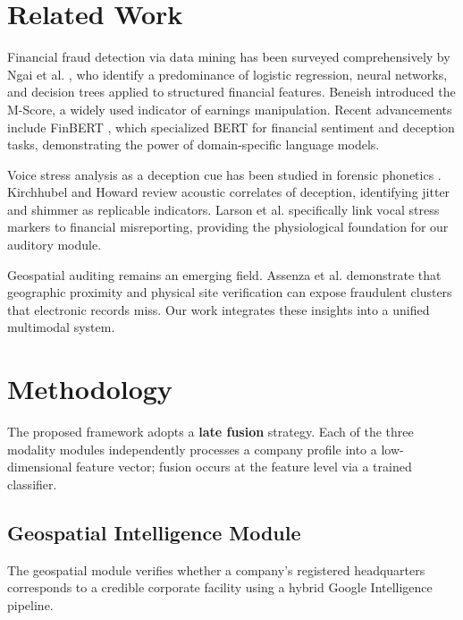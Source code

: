 \documentclass[conference]{IEEEtran}
\begin{document}
\section{Related Work}

Financial fraud detection via data mining has been surveyed comprehensively by
Ngai et al. \cite{ngai2011}, who identify a predominance of logistic regression,
neural networks, and decision trees applied to structured financial features.
Beneish \cite{beneish1999} introduced the M-Score, a widely used indicator of 
earnings manipulation. Recent advancements include FinBERT \cite{yang2020}, 
which specialized BERT for financial sentiment and deception tasks, demonstrating 
the power of domain-specific language models.

Voice stress analysis as a deception cue has been studied in forensic phonetics 
\cite{hollien1990}. Kirchhubel and Howard \cite{kirchhubel2013} review acoustic 
correlates of deception, identifying jitter and shimmer as replicable 
indicators. Larson et al. \cite{larson2021} specifically link vocal stress markers 
to financial misreporting, providing the physiological foundation for our auditory module.

Geospatial auditing remains an emerging field. Assenza et al. \cite{assenza2023} 
demonstrate that geographic proximity and physical site verification can expose 
fraudulent clusters that electronic records miss. Our work integrates these 
insights into a unified multimodal system.

\section{Methodology}

The proposed framework adopts a \textbf{late fusion} strategy. Each of the three
modality modules independently processes a company profile into a low-dimensional
feature vector; fusion occurs at the feature level via a trained classifier.

\subsection{Geospatial Intelligence Module}

The geospatial module verifies whether a company's registered headquarters
corresponds to a credible corporate facility using a hybrid Google 
Intelligence pipeline.
\end{document}
